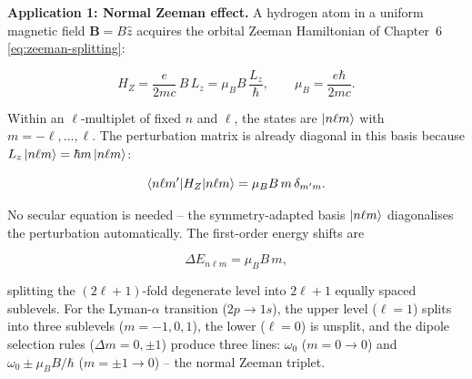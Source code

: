 \medskip\noindent\textbf{Application 1: Normal Zeeman effect.}
A hydrogen atom in a uniform magnetic field $\bm B = B\hat{z}$ acquires the orbital Zeeman Hamiltonian of Chapter~6 \eqref{eq:zeeman-splitting}:
\begin{linenomath}
\begin{equation*}
H_{Z} = \frac{e}{2mc}\,B\,L_{z} = \mu_{B} B\,\frac{L_{z}}{\hbar},
\qquad \mu_{B} = \frac{e\hbar}{2mc}.
\end{equation*}
\end{linenomath}
Within an $\ell$-multiplet of fixed $n$ and $\ell$, the states are $\ket{n\ell m}$ with $m = -\ell,\ldots,\ell$. The perturbation matrix is already diagonal in this basis because $L_{z}\ket{n\ell m} = \hbar m\ket{n\ell m}$:
\begin{linenomath}
\begin{equation*}
\braket{n\ell m'|H_{Z}|n\ell m} = \mu_{B}B\,m\,\delta_{m'm}.
\end{equation*}
\end{linenomath}
No secular equation is needed -- the symmetry-adapted basis $\ket{n\ell m}$ diagonalises the perturbation automatically. The first-order energy shifts are
\begin{linenomath}
\begin{equation*}
\Delta E_{n\ell m} = \mu_{B}B\,m,
\end{equation*}
\end{linenomath}
splitting the $(2\ell+1)$-fold degenerate level into $2\ell+1$ equally spaced sublevels. For the Lyman-$\alpha$ transition ($2p \to 1s$), the upper level ($\ell=1$) splits into three sublevels ($m=-1,0,1$), the lower ($\ell=0$) is unsplit, and the dipole selection rules ($\Delta m = 0,\pm1$) produce three lines: $\omega_{0}$ ($m=0 \to 0$) and $\omega_{0} \pm \mu_{B}B/\hbar$ ($m=\pm1 \to 0$) -- the normal Zeeman triplet.


